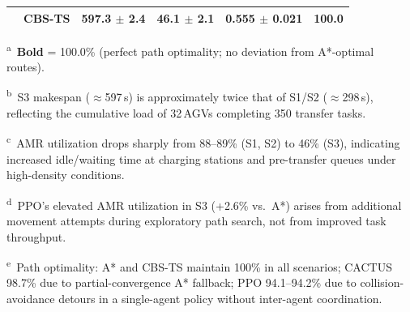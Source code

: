 \begin{table}[htbp]
\begin{threeparttable}
\begin{tabular}{llrrrr}
        & CBS-TS  & 597.3 $\pm$ 2.4 & 46.1 $\pm$ 2.1 & 0.555 $\pm$ 0.021 & \textbf{100.0} \\
      \bottomrule
    \end{tabular}
    \begin{tablenotes}
      \footnotesize
      \item \textsuperscript{a}~\textbf{Bold} = 100.0\% (perfect path optimality; no deviation
            from A*-optimal routes).
      \item \textsuperscript{b}~S3 makespan ($\approx$597\,s) is approximately twice that of
            S1/S2 ($\approx$298\,s), reflecting the cumulative load of 32\,AGVs
            completing 350 transfer tasks.
      \item \textsuperscript{c}~AMR utilization drops sharply from 88--89\% (S1, S2) to
            46\% (S3), indicating increased idle/waiting time at charging stations
            and pre-transfer queues under high-density conditions.
      \item \textsuperscript{d}~PPO's elevated AMR utilization in S3 (+2.6\% vs.\ A*)
            arises from additional movement attempts during exploratory path search,
            not from improved task throughput.
      \item \textsuperscript{e}~Path optimality: A* and CBS-TS maintain 100\% in all
            scenarios; CACTUS 98.7\% due to partial-convergence A* fallback;
            PPO 94.1--94.2\% due to collision-avoidance detours in a
            single-agent policy without inter-agent coordination.
    \end{tablenotes}
  \end{threeparttable}
\end{table}
